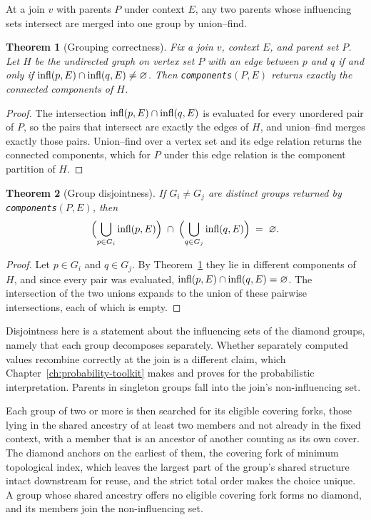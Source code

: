 \documentclass[12pt]{report}
\newtheorem{theorem}{Theorem}
\begin{document}
At a join $v$ with parents $P$ under context $E$, any two parents whose influencing sets intersect are merged into one group by union--find.

\begin{theorem}[Grouping correctness]
\label{thm:grouping}
Fix a join $v$, context $E$, and parent set $P$. Let $H$ be the undirected graph on vertex set $P$ with an edge between $p$ and $q$ if and only if $\mathrm{infl}(p,E) \cap \mathrm{infl}(q,E) \neq \varnothing$. Then \texttt{components}$(P,E)$ returns exactly the connected components of $H$.
\end{theorem}

\begin{proof}
The intersection $\mathrm{infl}(p,E) \cap \mathrm{infl}(q,E)$ is evaluated for every unordered pair of $P$, so the pairs that intersect are exactly the edges of $H$, and union--find merges exactly those pairs. Union--find over a vertex set and its edge relation returns the connected components, which for $P$ under this edge relation is the component partition of $H$.
\end{proof}

\begin{theorem}[Group disjointness]
\label{thm:disjoint}
If $G_i \neq G_j$ are distinct groups returned by \texttt{components}$(P,E)$, then
\[
\Bigl(\bigcup_{p\in G_i}\mathrm{infl}(p,E)\Bigr) \;\cap\; \Bigl(\bigcup_{q\in G_j}\mathrm{infl}(q,E)\Bigr) \;=\; \varnothing .
\]
\end{theorem}

\begin{proof}
Let $p \in G_i$ and $q \in G_j$. By Theorem~\ref{thm:grouping} they lie in different components of $H$, and since every pair was evaluated, $\mathrm{infl}(p,E) \cap \mathrm{infl}(q,E) = \varnothing$. The intersection of the two unions expands to the union of these pairwise intersections, each of which is empty.
\end{proof}

Disjointness here is a statement about the influencing sets of the diamond groups, namely that each group decomposes separately. Whether separately computed values recombine correctly at the join is a different claim, which Chapter~\ref{ch:probability-toolkit} makes and proves for the probabilistic interpretation. Parents in singleton groups fall into the join's non-influencing set.

Each group of two or more is then searched for its eligible covering forks, those lying in the shared ancestry of at least two members and not already in the fixed context, with a member that is an ancestor of another counting as its own cover. The diamond anchors on the earliest of them, the covering fork of minimum topological index, which leaves the largest part of the group's shared structure intact downstream for reuse, and the strict total order makes the choice unique. A group whose shared ancestry offers no eligible covering fork forms no diamond, and its members join the non-influencing set.
\end{document}
